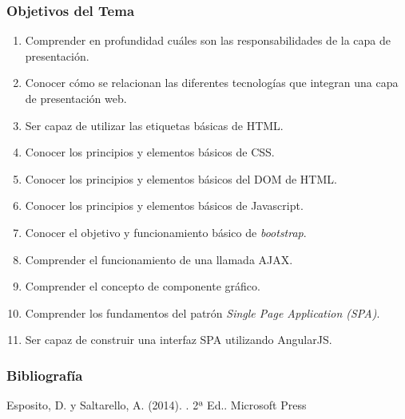 \documentclass[a4paper,slidestop,xcolor=pst,blue]{beamer}
\begin{document}
\begin{frame}[c]
    \frametitle{Objetivos del Tema}
    \begin{enumerate}[<+->]
         \item Comprender en profundidad cuáles son las responsabilidades de la capa de presentación.
         \item Conocer cómo se relacionan las diferentes tecnologías que integran una capa de presentación web.
         \item Ser capaz de utilizar las etiquetas básicas de HTML.
         \item Conocer los principios y elementos básicos de CSS.
         \item Conocer los principios y elementos básicos del DOM de HTML.
         \item Conocer los principios y elementos básicos de Javascript.
         \item Conocer el objetivo y funcionamiento básico de \emph{bootstrap}.
         \item Comprender el funcionamiento de una llamada AJAX.
         \item Comprender el concepto de componente gráfico.
         \item Comprender los fundamentos del patrón \emph{Single Page Application (SPA)}.
         \item Ser capaz de construir una interfaz SPA utilizando AngularJS.
    \end{enumerate}
\end{frame}

\begin{frame}[c]
    \frametitle{Bibliografía}
    \begin{thebibliography}{1}

        Esposito, D. y Saltarello, A. (2014).
        . 2ª Ed..
        \newblock Microsoft Press







    \end{thebibliography}
\end{frame}
\end{document}
